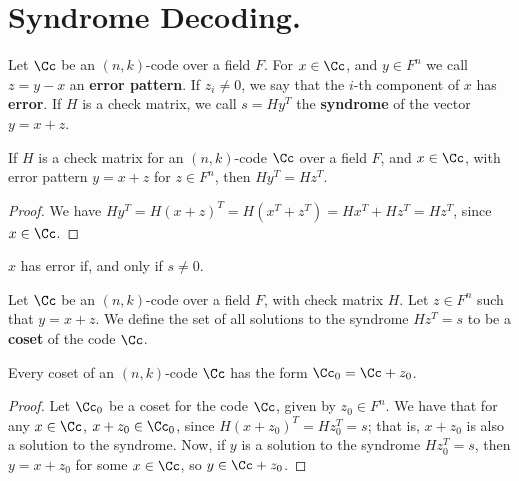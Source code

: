 
\section{Syndrome Decoding.}
\label{section1}

\begin{definition}
    Let $\Cc$ be an $(n,k)$-code over a field $F$. For $x \in \Cc$, and $y \in
    F^n$ we call  $z=y-x$ an \textbf{error pattern}. If $z_i \neq 0$, we say
    that the  $i$-th component of  $x$ has \textbf{error}. If $H$ is a check
    matrix, we call  $s=Hy^T$ the  \textbf{syndrome} of the vector $y=x+z$.
\end{definition}

\begin{lemma}\label{2.2.1}
    If $H$ is a check matrix for an  $(n,k)$-code $\Cc$ over a field $F$, and
    $x \in \Cc$, with error pattern  $y=x+z$ for $z \in F^n$, then $Hy^T=Hz^T$.
\end{lemma}
\begin{proof}
    We have $Hy^T=H(x+z)^T=H(x^T+z^T)=Hx^T+Hz^T=Hz^T$, since $x \in \Cc$.
\end{proof}
\begin{corollary}
    $x$ has error if, and only if  $s \neq 0$.
\end{corollary}

\begin{definition}
    Let $\Cc$ be an  $(n,k)$-code over a field $F$, with check matrix  $H$. Let
     $z \in F^n$ such that  $y=x+z$. We define the set of all solutions to the
     syndrome  $Hz^T=s$ to be a  \textbf{coset} of the code $\Cc$.
\end{definition}

\begin{lemma}\label{2.2.2}
    Every coset of an $(n,k)$-code $\Cc$ has the form  $\Cc_0=\Cc+z_0$.
\end{lemma}
\begin{proof}
    Let $\Cc_0$ be a coset for the code $\Cc$, given by  $z_0 \in F^n$. We have
    that for any $x \in \Cc$,  $x+z_0 \in \Cc_0$, since $H(x+z_0)^T=Hz_0^T=s$;
    that is, $x+z_0$ is also a solution to the syndrome. Now, if $y$ is a
    solution to the syndrome $Hz_0^T=s$, then $y=x+z_0$ for some $x \in \Cc$, so
     $y \in \Cc+z_0$.
\end{proof}

